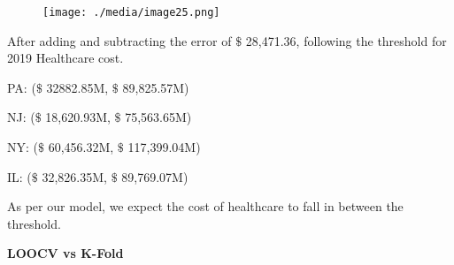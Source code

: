 \documentclass[12pt]{article}
\begin{document}

\begin{figure}[H]
	\begin{Center}
		\texttt{[image: ./media/image25.png]}
	\end{Center}
\end{figure}



\par

\begin{justify}
After adding and subtracting the error of $\$$ 28,471.36, following the threshold for 2019 Healthcare cost.
\end{justify}\par

PA: ($\$$ 32882.85M, $\$$ 89,825.57M)\par

NJ: ($\$$ 18,620.93M, $\$$ 75,563.65M)\par

NY: ($\$$ 60,456.32M, $\$$ 117,399.04M)\par

IL: ($\$$ 32,826.35M, $\$$ 89,769.07M)\par


\vspace{\baselineskip}
\begin{justify}
As per our model, we expect the cost of healthcare to fall in between the threshold. 
\end{justify}\par


\vspace{\baselineskip}
\begin{adjustwidth}{2.0in}{0.0in}
\begin{justify}
\textbf{LOOCV vs K-Fold}
\end{justify}\par

\end{adjustwidth}





\begin{figure}[H]	\begin{subfigure}		\texttt{[image: ./media/image26.png]}
	\end{subfigure}
~	\begin{subfigure}		\texttt{[image: ./media/image26.png]}
	\end{subfigure}
~
\end{figure}
\end{document}
